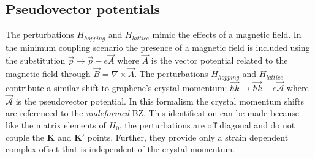 \subsection{Pseudovector potentials}
The perturbations $H_{hopping}$ and $H_{lattice}$ mimic the effects of a magnetic field.
In the minimum coupling scenario the presence of a magnetic field is included using the substitution $\vec{p} \rightarrow \vec{p} - e \vec{A}$ where $\vec{A}$ is the vector potential related to the magnetic field through $\vec{B}=\nabla \times \vec{A}$.
The perturbations $H_{hopping}$ and $H_{lattice}$ contribute a similar shift to graphene's crystal momentum: $\vec{\hbar k} \rightarrow \vec{\hbar k} - e \vec{\mathcal{A}}$ where $\vec{\mathcal{A}}$ is the pseudovector potential.
In this formalism the crystal momentum shifts are referenced to the \emph{undeformed} BZ.
This identification can be made because like the matrix elements of $H_0$, the perturbations are off diagonal and do not couple the $\bm{K}$ and $\bm{K'}$ points.
Further, they provide only a strain dependent complex offset that is independent of the crystal momentum.


